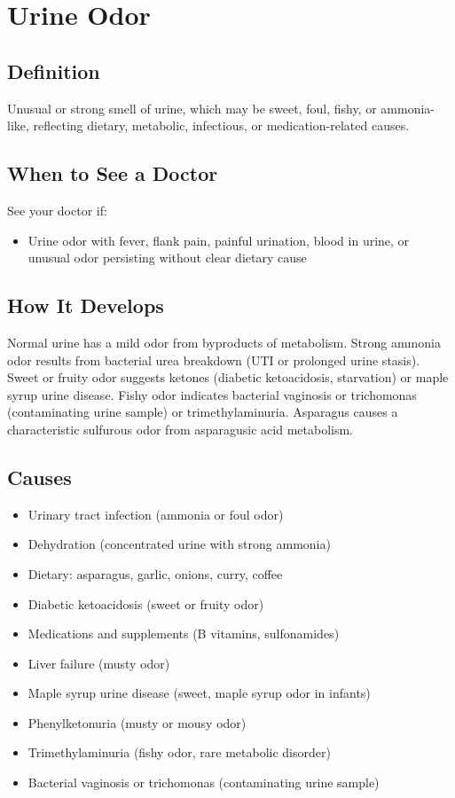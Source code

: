 \chapter{Urine Odor}

\section*{Definition}
Unusual or strong smell of urine, which may be sweet, foul, fishy, or ammonia-like, reflecting dietary, metabolic, infectious, or medication-related causes.

\section*{When to See a Doctor}
See your doctor if:
\begin{itemize}
  \item Urine odor with fever, flank pain, painful urination, blood in urine, or unusual odor persisting without clear dietary cause
\end{itemize}

\section*{How It Develops}
Normal urine has a mild odor from byproducts of metabolism. Strong ammonia odor results from bacterial urea breakdown (UTI or prolonged urine stasis). Sweet or fruity odor suggests ketones (diabetic ketoacidosis, starvation) or maple syrup urine disease. Fishy odor indicates bacterial vaginosis or trichomonas (contaminating urine sample) or trimethylaminuria. Asparagus causes a characteristic sulfurous odor from asparagusic acid metabolism.

\section*{Causes}
\begin{itemize}
  \item Urinary tract infection (ammonia or foul odor)
  \item Dehydration (concentrated urine with strong ammonia)
  \item Dietary: asparagus, garlic, onions, curry, coffee
  \item Diabetic ketoacidosis (sweet or fruity odor)
  \item Medications and supplements (B vitamins, sulfonamides)
  \item Liver failure (musty odor)
  \item Maple syrup urine disease (sweet, maple syrup odor in infants)
  \item Phenylketonuria (musty or mousy odor)
  \item Trimethylaminuria (fishy odor, rare metabolic disorder)
  \item Bacterial vaginosis or trichomonas (contaminating urine sample)
\end{itemize}

